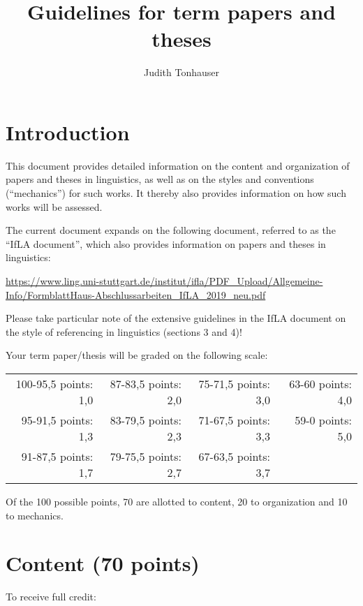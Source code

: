\documentclass[11pt,fleqn,a4paper/thesis]{article}
\title{Guidelines for term papers and theses}
\author{Judith Tonhauser}
\affil{University of Stuttgart}
\newcommand{\6}{\mbox{$[\hspace*{-.6mm}[$}}
\newcommand{\9}{\mbox{$]\hspace*{-.6mm}]$}}
\begin{document}
\maketitle

\section{Introduction}

This document provides detailed information on the content and organization of papers and theses in linguistics, as well as on the styles and conventions (``mechanics'') for such works. It thereby also provides information on how such works will be assessed. 

The current document expands on the following document, referred to as the ``IfLA document'', which also provides information on papers and theses in linguistics: 

\url{https://www.ling.uni-stuttgart.de/institut/ifla/PDF_Upload/Allgemeine-Info/FormblattHaus-Abschlussarbeiten_IfLA_2019_neu.pdf}

Please take particular note of the extensive guidelines in the IfLA document on the style of referencing in linguistics (sections 3 and 4)!

Your term paper/thesis will be graded on the following scale: 

\setlength{\tabcolsep}{20pt}
\begin{tabular}{rrrr}
100-95,5 points: 1,0 & 87-83,5 points: 2,0 & 75-71,5 points: 3,0 & 63-60 points: 4,0  \\ 
95-91,5 points: 1,3 & 83-79,5 points: 2,3  & 71-67,5 points: 3,3 & 59-0 points: 5,0 \\
91-87,5 points: 1,7 & 79-75,5 points: 2,7 & 67-63,5 points: 3,7 & \\
\end{tabular}

Of the 100 possible points, 70 are allotted to content, 20 to organization and 10 to mechanics.

\section{Content (70 points)}

To receive full credit:
\end{document}
